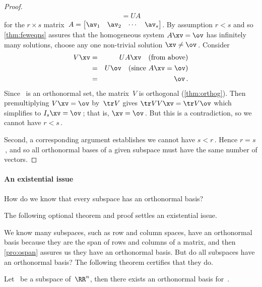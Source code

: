 \begin{proof}
\begin{eqnarray*}
=UA
\end{eqnarray*}
for the \(r\times s\) matrix~\(A=\begin{bmatrix} \av_1& \av_2&\cdots&\av_s \end{bmatrix}\).
By assumption \(r<s\) and so \autoref{thm:feweqns} assures that the homogeneous system \(A\xv=\ov\) has infinitely many solutions, choose any one non-trivial solution \(\xv\neq\ov\)\,.
Consider 
\begin{eqnarray*}
V\xv&=& UA\xv\quad(\text{from above})
\\&=&U\ov\quad(\text{since }A\xv=\ov)
\\&=&\ov\,.
\end{eqnarray*}
Since \cV\ is an orthonormal set, the matrix~\(V\) is orthogonal (\autoref{thm:orthog}).  
Then premultiplying \(V\xv=\ov\) by~\(\tr V\) gives \(\tr VV\xv=\tr V\ov\) which simplifies to \(I_s\xv=\ov\)\,; that is, \(\xv=\ov\)\,.  
But this is a contradiction, so we cannot have \(r<s\)\,.

Second, a corresponding argument establishes we cannot have \(s<r\)\,.
Hence \(r=s\)\,, and so all orthonormal bases of a given subspace must have the same number of vectors.
\end{proof}







\begin{comment}
Some books do not appear to establish that every subspace is a span of something.  The following argument is similar to Gramm--Schmidt, but not identical.  
\end{comment}

\paragraph{An existential issue} 
How do we know that every subspace has an orthonormal basis? 
\begin{aside}
The following optional theorem and proof settles an existential issue.
\end{aside}%
We know many subspaces, such as row and column spaces, have an orthonormal basis because they are the span of rows and columns of a matrix, and then \autoref{pro:ospan} assures us they have an orthonormal basis.
But do all subspaces have an orthonormal basis?  
The following theorem certifies that they do.



\begin{theorem} \label{thm:obaseexists}
Let \WW\ be a subspace of~\(\RR^n\), then there exists an orthonormal basis for~\WW.
\end{theorem}

